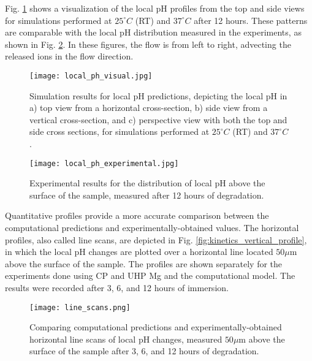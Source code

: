 Fig. \ref{fig:kinetics_local_ph_visual} shows a visualization of the local pH profiles from the top and side views for simulations performed at  $25^{\circ}C$ (\gls{RT}) and $37^{\circ}C$ after 12 hours. These patterns are comparable with the local pH distribution measured in the experiments, as shown in Fig. \ref{fig:kinetics_local_ph_experimental}. In these figures, the flow is from left to right, advecting the released ions in the flow direction.

\begin{figure}[h]
\centering
\medskip
\texttt{[image: local\_ph\_visual.jpg]}
\caption[Simulation results for local pH predictions]{Simulation results for local pH predictions, depicting the local pH in a) top view from a horizontal cross-section, b) side view from a vertical cross-section, and c) perspective view with both the top and side cross sections, for simulations performed at $25^{\circ}C$ (\gls{RT}) and $37^{\circ}C$.} \label{fig:kinetics_local_ph_visual}
\end{figure}

\begin{figure}[h]
\centering
\medskip
\texttt{[image: local\_ph\_experimental.jpg]}
\caption[Experimental results for the distribution of local pH above the sample]{Experimental results for the distribution of local pH above the surface of the sample, measured after 12 hours of degradation.} \label{fig:kinetics_local_ph_experimental}
\end{figure}

Quantitative profiles provide a more accurate comparison between the computational predictions and experimentally-obtained values. The horizontal profiles, also called line scans, are depicted in Fig. \ref{fig:kinetics_vertical_profile}, in which the local pH changes are plotted over a horizontal line located $50 \mu\mathrm{m}$ above the surface of the sample. The profiles are shown separately for the experiments done using \gls{CP} and \gls{UHP} Mg and the computational model. The results were recorded after 3, 6, and 12 hours of immersion.

\begin{figure}[h]
\centering
\medskip
\texttt{[image: line\_scans.png]}
\caption[Comparing computational and experimental for horizontal line scans of local pH]{Comparing computational predictions and experimentally-obtained horizontal line scans of local pH changes, measured $50 \mu\mathrm{m}$ above the surface of the sample after 3, 6, and 12 hours of degradation.} \label{fig:kinetics_line_scans}
\end{figure}

